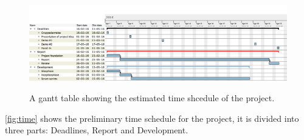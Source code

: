 \documentclass[../main.tex]{subfiles}
\begin{document}
\begin{figure}[H]
\centering

\caption{A gantt table showing the estimated time shcedule of the project.}
\includegraphics[width=18cm]{images/Timetable}
\label{fig:time}
\end{figure}

\autoref{fig:time} shows the preliminary time schedule for the project, it is divided into three parts: Deadlines, Report and Development.
\end{document}
